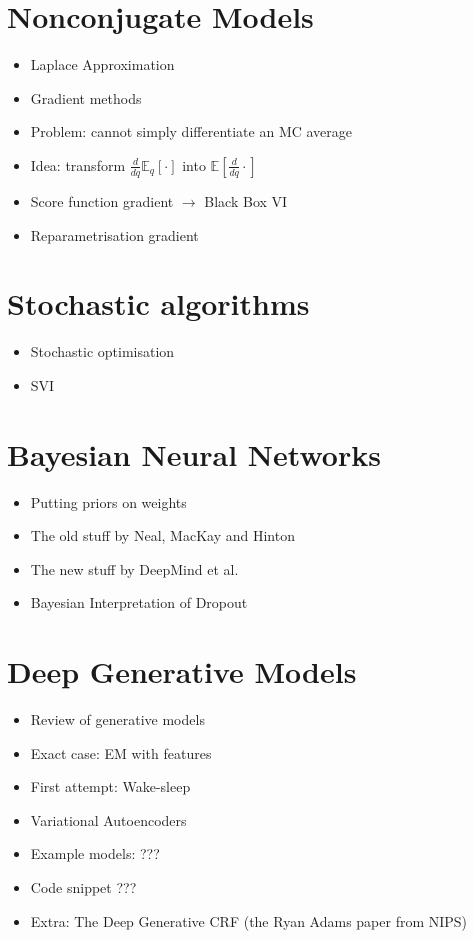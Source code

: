 \documentclass[11pt, a4paper]{article}
\begin{document}
\section{Nonconjugate Models}
\begin{itemize}
\item Laplace Approximation 
\item Gradient methods
\item Problem: cannot simply differentiate an MC average
\item Idea: transform $ \frac{d}{dq} \mathbb{E}_{q}[\cdot] $ into $ \mathbb{E}[\frac{d}{dq}\cdot] $
\item Score function gradient $ \rightarrow $ Black Box VI \citep{PaisleyEtAl:2012, RanganathEtAl:2014}
\item Reparametrisation gradient \citep{KingmaWelling:2013, RezendeEtAl:2014, TitsiasLazarogredilla:2014}
\end{itemize}

\section{Stochastic algorithms}

\begin{itemize}
	\item Stochastic optimisation \citep{RobbinsEtAl:1951}
	\item SVI \citep{HoffmanEtAl:2013}
\end{itemize}

\section{Bayesian Neural Networks}
\begin{itemize}
\item Putting priors on weights
\item The old stuff by Neal, MacKay and Hinton \citep{HintonVancamp:1993}
\item The new stuff by DeepMind et al. \citep{Graves:2011, BlundellEtAl:2015}
\item Bayesian Interpretation of Dropout \citep{Gal:2016}
\end{itemize}

\section{Deep Generative Models}
\begin{itemize}
\item Review of generative models
\item Exact case: EM with features \citep{BergkirkpatrickEtAl:2010}
\item First attempt: Wake-sleep \citep{HintonEtAl:1995}
\item Variational Autoencoders \citep{KingmaWelling:2013, RezendeEtAl:2014}
\item Example models: ???
\item Code snippet ??? 
\item Extra: The Deep Generative CRF (the Ryan Adams paper from NIPS)
\end{itemize}
\end{document}
